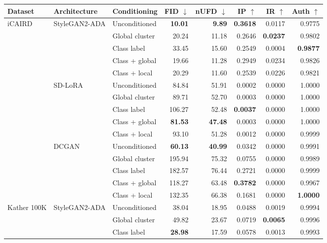 \begin{table}[htbp]
\centering
\scriptsize
\setlength{\tabcolsep}{3.2pt}
\renewcommand{\arraystretch}{1.05}
\begin{tabular}{lllrrrrr}
\toprule
Dataset & Architecture & Conditioning & FID $\downarrow$ & nUFD $\downarrow$ & IP $\uparrow$ & IR $\uparrow$ & Auth $\uparrow$ \\
\midrule
\multirow{15}{*}{iCAIRD} & \multirow{5}{*}{StyleGAN2-ADA} & Unconditioned & \textbf{10.01} & \textbf{9.89} & \textbf{0.3618} & 0.0117 & 0.9775 \\
 &  & Global cluster & 20.24 & 11.18 & 0.2646 & \textbf{0.0237} & 0.9802 \\
 &  & Class label & 33.45 & 15.60 & 0.2549 & 0.0004 & \textbf{0.9877} \\
 &  & Class + global & 19.66 & 11.28 & 0.2949 & 0.0234 & 0.9826 \\
 &  & Class + local & 20.29 & 11.60 & 0.2539 & 0.0226 & 0.9821 \\
\cmidrule(lr){2-8}
 & \multirow{5}{*}{SD-LoRA} & Unconditioned & 84.84 & 51.91 & 0.0002 & 0.0000 & 1.0000 \\
 &  & Global cluster & 89.71 & 52.70 & 0.0003 & 0.0000 & 1.0000 \\
 &  & Class label & 106.27 & 52.48 & \textbf{0.0037} & 0.0000 & 1.0000 \\
 &  & Class + global & \textbf{81.53} & \textbf{47.48} & 0.0003 & 0.0000 & 1.0000 \\
 &  & Class + local & 93.10 & 51.28 & 0.0012 & 0.0000 & 0.9999 \\
\cmidrule(lr){2-8}
 & \multirow{5}{*}{DCGAN} & Unconditioned & \textbf{60.13} & \textbf{40.99} & 0.0342 & 0.0000 & 0.9991 \\
 &  & Global cluster & 195.94 & 75.32 & 0.0755 & 0.0000 & 0.9989 \\
 &  & Class label & 182.57 & 76.44 & 0.2721 & 0.0000 & 0.9999 \\
 &  & Class + global & 118.27 & 63.48 & \textbf{0.3782} & 0.0000 & 0.9967 \\
 &  & Class + local & 132.35 & 66.38 & 0.1681 & 0.0000 & \textbf{1.0000} \\
\midrule
\multirow{15}{*}{Kather 100K} & \multirow{5}{*}{StyleGAN2-ADA} & Unconditioned & 38.04 & 18.95 & 0.0488 & 0.0019 & 0.9994 \\
 &  & Global cluster & 49.82 & 23.67 & 0.0719 & \textbf{0.0065} & 0.9996 \\
 &  & Class label & \textbf{28.98} & 17.59 & 0.0578 & 0.0013 & 0.9993 \\

\end{tabular}
\end{table}
